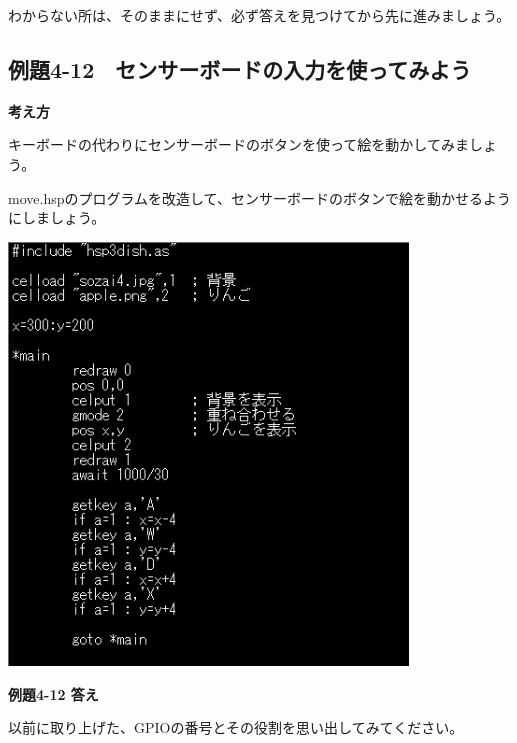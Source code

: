 \documentclass[a4paper,12pt]{jarticle}
\begin{document}
わからない所は、そのままにせず、必ず答えを見つけてから先に進みましょう。

\clearpage
\subsection{例題4-12　センサーボードの入力を使ってみよう}
\bigskip
\bigskip

{\bfseries
考え方}

\bigskip

キーボードの代わりにセンサーボードのボタンを使って絵を動かしてみましょう。

move.hspのプログラムを改造して、センサーボードのボタンで絵を動かせるようにしましょう。

\bigskip
\bigskip

\begin{minipage}{9.781cm}
\centering
{\upshape
\includegraphics[keepaspectratio,width=10.61cm,height=11.229cm]{text04-img/text04-img037.png}}
\end{minipage}

\bigskip
\bigskip
\bigskip

{\bfseries
例題4-12 答え}


\bigskip

以前に取り上げた、GPIOの番号とその役割を思い出してみてください。

\bigskip
\bigskip
\end{document}
